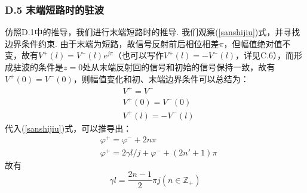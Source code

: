 \documentclass[UTF8]{ctexart}
\begin{document}
\subsubsection*{D.5 末端短路时的驻波}
仿照D.1中的推导，我们进行末端短路时的推导. 我们观察(\ref{sanshijiu})式，并寻找边界条件约束. 由于末端为短路，故信号反射前后相位相差$\pi$，但幅值绝对值不变，故有$V^+(l)=V^-(l)e^{j\pi}$（也可以写作$V^+(l)=-V^-(l)$，详见C.6），而形成驻波的条件是$z=0$处从末端反射回的信号和初始的信号保持一致，故有$V^+(0)=V^-(0)$，则幅值变化和初、末端边界条件可以总结为：
\begin{equation}
    \begin{aligned}
    &V^+=V^-\\
    &V^+(0)=V^-(0)\\
    &V^+(l)=-V^-(l)
    \end{aligned}
\end{equation}
代入(\ref{sanshijiu})式，可以推导出：
\begin{equation}
    \begin{aligned}
        &\varphi^+=\varphi^-+2n\pi\\
        &\varphi^+=2\gamma l/j+\varphi^-+(2n'+1)\pi
    \end{aligned}
\end{equation}
故有\begin{equation}\gamma l=\frac{2n-1}{2}\pi j(n\in \mathbb{Z}_+)\label{sishier2}\end{equation}\\
\end{document}
